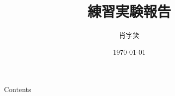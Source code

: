 \documentclass[aspectratio=43,handout]{ctexbeamer}
\title{練習実験報告}
\author{肖宇笑}
\date{\today}
\begin{document}
	\titleframe						    %
%
	\begin{frame}{Contents}
	\tableofcontents
	\end{frame}
\end{document}
